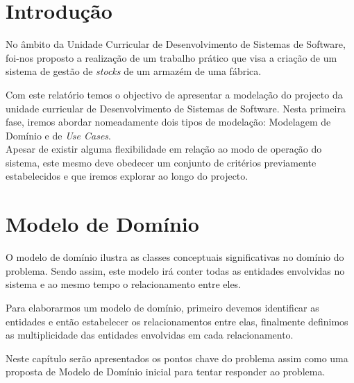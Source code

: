\documentclass[a4paper]{report}
\begin{document}
\tableofcontents

\pagebreak

\chapter{Introdução}
No âmbito da Unidade Curricular de Desenvolvimento de Sistemas de Software, foi-nos proposto a realização de um trabalho prático que visa a criação de um sistema de gestão de \textit{stocks} de um armazém de uma fábrica.

Com este relatório temos o objectivo de apresentar a modelação do projecto da unidade curricular de Desenvolvimento de Sistemas de Software. Nesta primeira fase, iremos abordar nomeadamente dois tipos de modelação: Modelagem de Domínio e de \textit{Use Cases}.\\

Apesar de existir alguma flexibilidade em relação ao modo de operação do sistema, este mesmo deve obedecer um conjunto de critérios previamente estabelecidos e que iremos explorar ao longo do projecto.

\chapter{Modelo de Domínio}
O modelo de domínio ilustra as classes conceptuais significativas no domínio do problema. Sendo assim, este modelo irá conter todas as entidades envolvidas no sistema e ao mesmo tempo o relacionamento entre eles.

Para elaborarmos um modelo de domínio, primeiro devemos identificar as entidades e então estabelecer os relacionamentos entre elas, finalmente definimos as multiplicidade das entidades envolvidas em cada relacionamento.

Neste capítulo serão apresentados os pontos chave do problema assim como uma proposta de Modelo de Domínio inicial para tentar responder ao problema.
 
\end{document}
